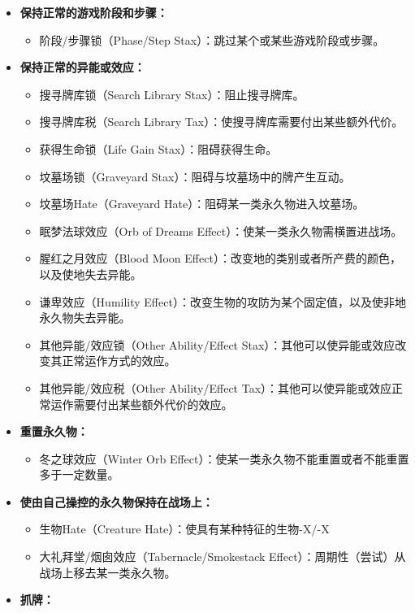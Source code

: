 \documentclass[lang = cn, color = black, 10pt]{AllThatStax}
\begin{document}
\begin{itemize}
	\item \textbf{保持正常的游戏阶段和步骤：}
		\begin{itemize}
			\item 阶段/步骤锁（Phase/Step Stax）：跳过某个或某些游戏阶段或步骤。
		\end{itemize}
	\item \textbf{保持正常的异能或效应：}
		\begin{itemize}
			\item 搜寻牌库锁（Search Library Stax）：阻止搜寻牌库。
			\item 搜寻牌库税（Search Library Tax）：使搜寻牌库需要付出某些额外代价。
			\item 获得生命锁（Life Gain Stax）：阻碍获得生命。
			\item 坟墓场锁（Graveyard Stax）：阻碍与坟墓场中的牌产生互动。
			\item 坟墓场Hate（Graveyard Hate）：阻碍某一类永久物进入坟墓场。
			\item 眠梦法球效应（Orb of Dreams Effect）：使某一类永久物需横置进战场。
			\item 腥红之月效应（Blood Moon Effect）：改变地的类别或者所产费的颜色，以及使地失去异能。
			\item 谦卑效应（Humility Effect）：改变生物的攻防为某个固定值，以及使非地永久物失去异能。
			\item 其他异能/效应锁（Other Ability/Effect Stax）：其他可以使异能或效应改变其正常运作方式的效应。
			\item 其他异能/效应税（Other Ability/Effect Tax）：其他可以使异能或效应正常运作需要付出某些额外代价的效应。
		\end{itemize}
	\item \textbf{重置永久物：}
		\begin{itemize}
			\item 冬之球效应（Winter Orb Effect）：使某一类永久物不能重置或者不能重置多于一定数量。
		\end{itemize}
	\item \textbf{使由自己操控的永久物保持在战场上：}
		\begin{itemize}
			\item 生物Hate（Creature Hate）：使具有某种特征的生物-X/-X
			\item 大礼拜堂/烟囱效应（Tabernacle/Smokestack Effect）：周期性（尝试）从战场上移去某一类永久物。
		\end{itemize}
	\item \textbf{抓牌：}
		\begin{itemize}

\end{itemize}
\end{itemize}
\end{document}
